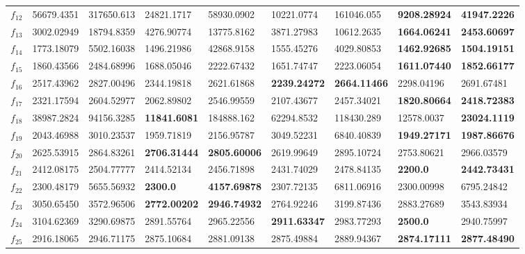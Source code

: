 \begin{table*}[t!]
{\begin{tabular}{|p{0.8cm}|p{1.6cm}|p{1.6cm}|p{1.6cm}|p{1.6cm}|p{1.6cm}|p{1.6cm}|p{1.6cm}|p{1.6cm}|}
$f_{12}$  & 56679.4351 & 317650.613 & 24821.1717 & 58930.0902 & 10221.0774 & 161046.055 & \textbf{9208.28924} & \textbf{41947.2226} \\ 
$f_{13}$  & 3002.02949 & 18794.8359 & 4276.90774 & 13775.8162 & 3871.27983 & 10612.2635 & \textbf{1664.06241} & \textbf{2453.60697} \\ 
$f_{14}$  & 1773.18079 & 5502.16038 & 1496.21986 & 42868.9158 & 1555.45276 & 4029.80853 & \textbf{1462.92685} & \textbf{1504.19151} \\ 
$f_{15}$  & 1860.43566 & 2484.68996 & 1688.05046 & 2222.67432 & 1651.74747 & 2223.06054 & \textbf{1611.07440} & \textbf{1852.66177} \\ 
$f_{16}$  & 2517.43962 & 2827.00496 & 2344.19818 & 2621.61868 & \textbf{2239.24272} & \textbf{2664.11466} & 2298.04196 & 2691.67481 \\ 
$f_{17}$  & 2321.17594 & 2604.52977 & 2062.89802 & 2546.99559 & 2107.43677 & 2457.34021 & \textbf{1820.80664} & \textbf{2418.72383} \\ 
$f_{18}$  & 38987.2824 & 94156.3285 & \textbf{11841.6081} & 184888.162 & 62294.8532 & 118430.289 & 12578.0037 & \textbf{23024.1119} \\ 
$f_{19}$  & 2043.46988 & 3010.23537 & 1959.71819 & 2156.95787 & 3049.52231 & 6840.40839 & \textbf{1949.27171} & \textbf{1987.86676} \\ 
$f_{20}$  & 2625.53915 & 2864.83261 & \textbf{2706.31444} & \textbf{2805.60006} & 2619.99649 & 2895.10724 & 2753.80621 & 2966.03579 \\ 
$f_{21}$  & 2412.08175 & 2504.77777 & 2414.52134 & 2456.71898 & 2431.74029 & 2478.84135 & \textbf{2200.0} & \textbf{2442.73431} \\ 
$f_{22}$  & 2300.48179 & 5655.56932 & \textbf{2300.0} & \textbf{4157.69878} & 2307.72135 & 6811.06916 & 2300.00998 & 6795.24842 \\ 
$f_{23}$  & 3050.65450 & 3572.96506 & \textbf{2772.00202} & \textbf{2946.74932} & 2764.92246 & 3199.87436 & 2883.27689 & 3543.83934 \\ 
$f_{24}$  & 3104.62369 & 3290.69875 & 2891.55764 & 2965.22556 & \textbf{2911.63347} & 2983.77293 & \textbf{2500.0} & 2940.75997 \\ 
$f_{25}$  & 2916.18065 & 2946.71175 & 2875.10684 & 2881.09138 & 2875.49884 & 2889.94367 & \textbf{2874.17111} & \textbf{2877.48490} \\ 

\end{tabular}}
\end{table*}
